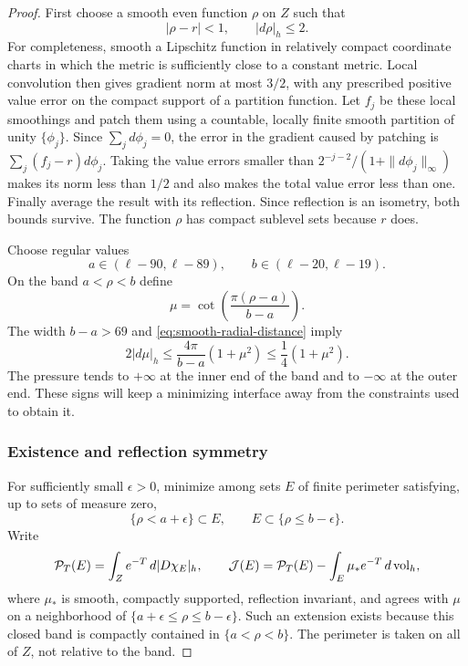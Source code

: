 \begin{proof}
First choose a smooth even function $\rho$ on $Z$ such that
\begin{equation}\label{eq:smooth-radial-distance}
 |\rho-r|<1,\qquad |d\rho|_h\le2.
\end{equation}
For completeness, smooth a Lipschitz function in relatively compact
coordinate charts in which the metric is sufficiently close to a
constant metric.  Local convolution then gives gradient norm at most
$3/2$, with any prescribed positive value error on the compact support
of a partition function.  Let $f_j$ be these local smoothings and patch
them using a countable, locally finite smooth partition of unity
$\{\phi_j\}$.  Since
$\sum_jd\phi_j=0$, the error in the gradient caused by patching is
$\sum_j(f_j-r)d\phi_j$.  Taking the value errors smaller than
$2^{-j-2}/(1+\|d\phi_j\|_\infty)$ makes its norm less than $1/2$ and
also makes the total value error less than one.  Finally average the
result with its reflection.  Since reflection is an isometry, both
bounds survive.  The function $\rho$ has compact sublevel sets because
$r$ does.

Choose regular values
\begin{equation}\label{eq:pressure-levels}
 a\in(\ell-90,\ell-89),\qquad b\in(\ell-20,\ell-19).
\end{equation}
On the band $a<\rho<b$ define
\begin{equation}\label{eq:cotangent-pressure}
 \mu=\cot\left(\frac{\pi(\rho-a)}{b-a}\right).
\end{equation}
The width $b-a>69$ and \eqref{eq:smooth-radial-distance} imply
\begin{equation}\label{eq:pressure-gradient}
 2|d\mu|_h
 \le\frac{4\pi}{b-a}(1+\mu^2)
 \le\frac14(1+\mu^2).
\end{equation}
The pressure tends to $+\infty$ at the inner end of the band and to
$-\infty$ at the outer end.  These signs will keep a minimizing
interface away from the constraints used to obtain it.

\subsubsection*{Existence and reflection symmetry}
For sufficiently small $\epsilon>0$, minimize among sets $E$ of finite
perimeter satisfying, up to sets of measure zero,
\begin{equation}\label{eq:phase-constraints}
 \{\rho<a+\epsilon\}\subset E,
 \qquad E\subset\{\rho\le b-\epsilon\}.
\end{equation}
Write
\[
 \mathcal P_T(E)=\int_Z e^{-T}\,d|D\chi_E|_h,
 \qquad
 \mathcal J(E)=\mathcal P_T(E)
       -\int_E\mu_*e^{-T}\,d\operatorname{vol}_h,
\]
where $\mu_*$ is smooth, compactly supported, reflection invariant, and
agrees with $\mu$ on a neighborhood of
$\{a+\epsilon\le\rho\le b-\epsilon\}$.  Such an extension exists
because this closed band is compactly contained in $\{a<\rho<b\}$.
The perimeter is taken on all of $Z$, not relative to the band.


\end{proof}
